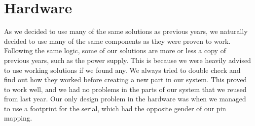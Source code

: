 \section {Hardware}

As we decided to use many of the same solutions as previous years, we naturally
decided to use many of the same components as they were proven to
work. Following the same logic, some of our solutions are more or less a copy of
previous years, such as the power supply. This is because we were heavily
advised to use working solutions if we found any. We always
tried to double check and find out how they worked before creating a new part in
our system. This proved to work well, and we had no problems in the parts of our
system that we reused from last year. Our only design problem in the hardware was
when we managed to use a footprint for the serial, which had the opposite gender
of our pin mapping.

